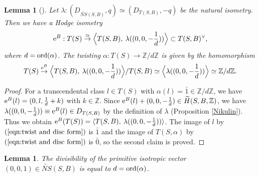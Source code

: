 \documentclass{article}
\theoremstyle{plain}
\newtheorem{lemma}[theorem]{Lemma}%
\theoremstyle{definition}
\theoremstyle{remark}
\newcommand{\Z}{{\mathbb Z}}
\begin{document}
\begin{lemma}[\cite{Ma2}] \label{twist and disc form}
Let 
$\lambda : (D_{\widetilde{NS}(S, B)}, q) \simeq (D_{T(S, B)}, -q)$ 
be the natural isometry. 
Then we have a Hodge isometry 
\begin{equation}\label{eqn:extension of trans lattice}
{\rm e\/}^{B} : 
T(S) 
\stackrel{\simeq}{\to} 
\Bigl\langle T(S,B), \: \lambda ((0, 0, -\frac{1}{d})) \Bigr\rangle \subset T(S, B)^{\vee} , 
\end{equation}
where 
$d={\rm ord\/}(\alpha )$. 
The twisting 
$\alpha : T(S) \to {\Z}/d{\Z}$ 
is given by the homomorphism 
\begin{equation}\label{eqn:twist and disc form} 
T(S) 
\stackrel{{\rm e\/}^{B}}{\to} 
\Bigl\langle T(S,B), \: \lambda ((0, 0, -\frac{1}{d})) \Bigr\rangle / T(S, B) 
\simeq 
\Bigl\langle \lambda ((0, 0, -\frac{1}{d})) \Bigr\rangle 
\simeq 
{\Z}/d{\Z} .
\end{equation}
\end{lemma}








\begin{proof}
For a transcendental class 
$l\in T(S)$ 
with 
$\alpha (l) =\bar{1} \in {\Z}/d{\Z}$, 
we have 
${\rm e\/}^{B}(l) = (0, l, \frac{1}{d}+k)$ 
with 
$k \in {\Z}$. 
Since 
${\rm e\/}^{B}(l)+(0, 0, -\frac{1}{d}) \in \widetilde{H}(S, B, {\Z})$, 
we have 
$\lambda ((0, 0, -\frac{1}{d})) \equiv {\rm e\/}^{B}(l) \in D_{T(S, B)}$ 
by the definition of $\lambda $ (Proposition \ref{Nikulin}).  
Thus 
we obtain 
${\rm e\/}^{B}(T(S)) = 
\langle T(S,B), \: \lambda ((0, 0, -\frac{1}{d})) \rangle $. 
The image of $l$ 
by $(\ref{eqn:twist and disc form})$ 
is $\bar{1}$ 
and the image of $T(S, \alpha )$ 
by $(\ref{eqn:twist and disc form})$ 
is $\bar{0}$, 
so the second claim is proved. 
\end{proof}  












\begin{lemma}\label{div(0, 0, 1)}
The divisibility of 
the primitive isotropic vector 
$(0, 0, 1) \in \widetilde{NS}(S, B)$
is equal to $d={\rm ord\/}(\alpha )$. 
\end{lemma} 
\end{document}
